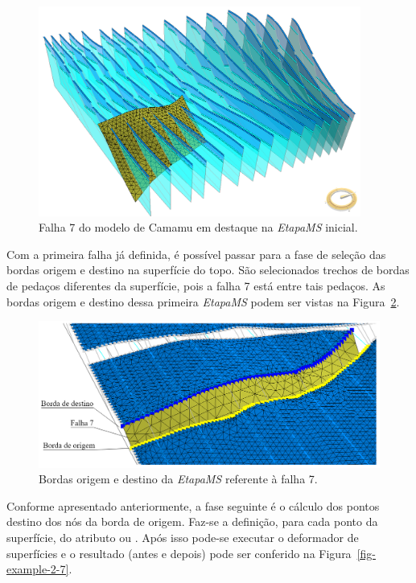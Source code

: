 \begin{figure} [H]
  \begin{center}
    \includegraphics[width=300pt]{images/fig-example-2-5}
    \caption{Falha 7 do modelo de Camamu em destaque na \textit{EtapaMS} inicial.}\label{fig-example-2-5}
  \end{center}
\end{figure}

Com a primeira falha já definida, é possível passar para a fase de seleção das bordas origem e destino na superfície do topo. São selecionados trechos de bordas de pedaços diferentes da superfície, pois a falha 7 está entre tais pedaços. As bordas origem e destino dessa primeira \textit{EtapaMS} podem ser vistas na Figura~\ref{fig-example-2-6}.

\begin{figure} [H]
  \begin{center}
    \includegraphics[width=350pt]{images/fig-example-2-6}
    \caption{Bordas origem e destino da \textit{EtapaMS} referente à falha 7.}\label{fig-example-2-6}
  \end{center}
\end{figure}

Conforme apresentado anteriormente, a fase seguinte é o cálculo dos pontos destino dos nós da borda de origem. Faz-se a definição, para cada ponto da superfície, do atributo  ou . Após isso pode-se executar o deformador de superfícies e o resultado (antes e depois) pode ser conferido na Figura~\ref{fig-example-2-7}.

